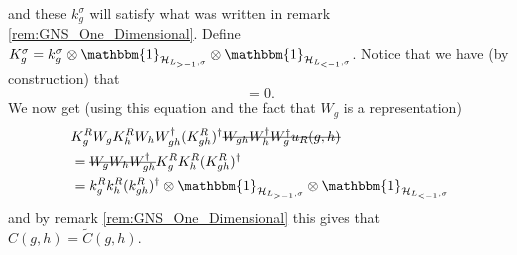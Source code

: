 \documentclass[12pt,a4paper,twoside]{article}
\newcommand{\stkout}[1]{\ifmmode\text{\sout{\ensuremath{#1}}}\else\sout{#1}\fi}
\newcommand{\HH}{\mathcal H}
\newcommand{\ZZ}{\mathbb Z}
\newcommand{\id}{\mathbbm{1}}
\theoremstyle{definition}
\numberwithin{equation}{section}
\begin{document}
and these $k^\sigma_g$ will satisfy what was written in remark \ref{rem:GNS_One_Dimensional}. Define $K^\sigma_g=k^\sigma_g\otimes\id_{\HH_{L_{>-1},\sigma}}\otimes\id_{\HH_{L_{<-1},\sigma}}$. Notice that we have (by construction) that
\begin{equation}
	[K^\sigma_g\otimes\id_{\HH_{\ZZ^2/\sigma}},W_g]=0.
\end{equation}
We now get (using this equation and the fact that $W_g$ is a representation)
\begin{align}
	&K_g^R W_g K_h^R W_h W_{gh}^\dagger (K_{gh}^R)^\dagger \stkout{W_{gh}W_h^\dagger W_g^\dagger u_R(g,h)}\\
	&=\stkout{W_g W_h W_{gh}^\dagger} K_g^R K_h^R (K_{gh}^R)^\dagger\\
	&=k_g^R k_h^R (k_{gh}^R)^\dagger\otimes \id_{\HH_{L_{>-1},\sigma}}\otimes\id_{\HH_{L_{<-1},\sigma}}
\end{align}
and by remark \ref{rem:GNS_One_Dimensional} this gives that $C(g,h)=\tilde{C}(g,h)$.
\end{document}

